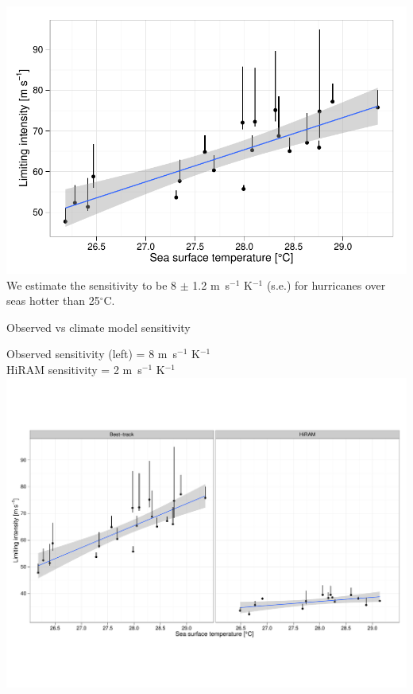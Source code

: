 \documentclass[handout]{beamer}
\begin{document}
\begin{frame}
\begin{center}
\includegraphics[scale=.65]{figures/Sensitivity.pdf}\\
We estimate the sensitivity to be \alert{8 $\pm$ 1.2 m~s$^{-1}$ K$^{-1}$ (s.e.)} for hurricanes over seas hotter than 25$^\circ$C.
\end{center}
\end{frame}

\begin{frame}{Observed vs climate model sensitivity}
\begin{center}
Observed sensitivity (left) = 8 m~s$^{-1}$ K$^{-1}$\\
HiRAM sensitivity = 2 m~s$^{-1}$ K$^{-1}$\\
\vspace{-1cm}
\includegraphics[scale=.37]{figures/sensHiRAMPlusOBS.pdf}\\
\end{center}
\end{frame}
\end{document}
